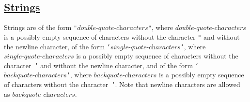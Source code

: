 \subsection*{\href{https://source-academy.github.io/sicp/chapters/2.3.1.html}{Strings}}

Strings are of the form \texttt{"}$ \textit{double-quote-characters} $\texttt{"},
where $\textit{double-quote-characters}$ is a possibly empty sequence of characters without
the character \texttt{"} and without the newline character, 
of the form
\texttt{'}$ \textit{single-quote-characters} $\texttt{'},
where $\textit{single-quote-characters}$ is a possibly empty sequence of characters without
the character~\texttt{'} and without the newline character,
and of the form
\texttt{`}$ \textit{backquote-characters} $\texttt{`},
where $\textit{backquote-characters}$ is a possibly empty sequence of characters without
the character~\texttt{`}. Note that newline characters are allowed as
$\textit{backquote-characters}$.

